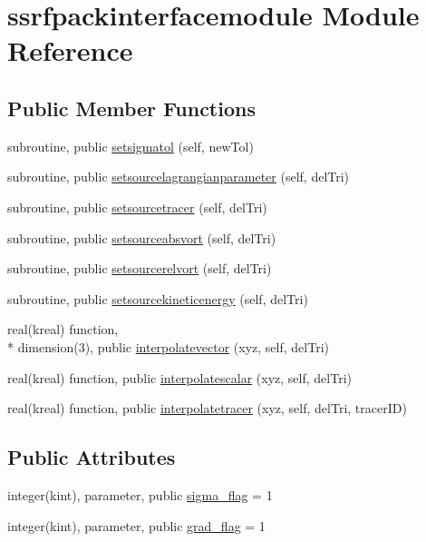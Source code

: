 \hypertarget{classssrfpackinterfacemodule}{\section{ssrfpackinterfacemodule Module Reference}
\label{classssrfpackinterfacemodule}
}
\subsection*{Public Member Functions}
\begin{DoxyCompactItemize}
\item 
subroutine, public \hyperlink{classssrfpackinterfacemodule_a75264a16d52d3d5b690e48a2fedf1f3c}{setsigmatol} (self, new\+Tol)
\item 
subroutine, public \hyperlink{classssrfpackinterfacemodule_afd6acb60f29c898bae8450d04a1162b3}{setsourcelagrangianparameter} (self, del\+Tri)
\item 
subroutine, public \hyperlink{classssrfpackinterfacemodule_a87f766d858b504de0b491599d55a8487}{setsourcetracer} (self, del\+Tri)
\item 
subroutine, public \hyperlink{classssrfpackinterfacemodule_a08d1ec645cfe5f81019a9e06fa356795}{setsourceabsvort} (self, del\+Tri)
\item 
subroutine, public \hyperlink{classssrfpackinterfacemodule_ab0dcf80c0408a708cd2389c84f8c033a}{setsourcerelvort} (self, del\+Tri)
\item 
subroutine, public \hyperlink{classssrfpackinterfacemodule_ac60b06e45aadb25044e3525c71f8da04}{setsourcekineticenergy} (self, del\+Tri)
\item 
real(kreal) function, \\*
dimension(3), public \hyperlink{classssrfpackinterfacemodule_a75ab76bb36890d37ec38050df8dec2c6}{interpolatevector} (xyz, self, del\+Tri)
\item 
real(kreal) function, public \hyperlink{classssrfpackinterfacemodule_a6c364f5ff552e1a8c4f92055226b7d7f}{interpolatescalar} (xyz, self, del\+Tri)
\item 
real(kreal) function, public \hyperlink{classssrfpackinterfacemodule_a65dd0a96886193cf4684ae943d6a514b}{interpolatetracer} (xyz, self, del\+Tri, tracer\+I\+D)
\end{DoxyCompactItemize}
\subsection*{Public Attributes}
\begin{DoxyCompactItemize}
\item 
integer(kint), parameter, public \hyperlink{classssrfpackinterfacemodule_aab9118e061bf334e412f174d571a0383}{sigma\+\_\+flag} = 1
\item 
integer(kint), parameter, public \hyperlink{classssrfpackinterfacemodule_a94dc725a7eeb76c6d6a9b367a985a383}{grad\+\_\+flag} = 1
\end{DoxyCompactItemize}


